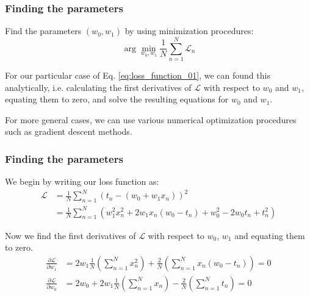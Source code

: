 \documentclass[english,10pt,aspectratio=169,fleqn]{beamer}
\begin{document}
\begin{frame} %
\frametitle{Finding the parameters}

Find the parameters $(w_{0},w_{1})$ by using minimization procedures:
\begin{equation*}
\arg\min_{w_{0},w_{1}} \frac{1}{N} \sum_{n=1}^{N} \mathcal{L}_{n}
\end{equation*}

For our particular case of Eq. \eqref{eq:loss_function_01}, we can found this analytically,
i.e. calculating the first derivatives of $\mathcal{L}$ with respect to $w_0$ and $w_1$, equating
them to zero, and solve the resulting equations for $w_0$ and $w_1$.

For more general cases, we can use various numerical optimization procedures such as
gradient descent methods.

\end{frame} %


\begin{frame} %
\frametitle{Finding the parameters}

We begin by writing our loss function as:
\begin{align*}
\mathcal{L} & = \frac{1}{N} \sum_{n=1}^{N} \left( t_n - (w_0 + w_1 x_{n}) \right)^2 \\
& = \frac{1}{N} \sum_{n=1}^{N} \left( w_1^2 x_n^2 + 2w_{1}x_{n}(w_0 - t_n) + w_0^2 - 2w_0 t_n + t_n^2 \right)
\end{align*}

Now we find the first derivatives of $\mathcal{L}$ with respect to
$w_0$, $w_1$ and equating them to zero.
\begin{align*}
\frac{\partial\mathcal{L}}{\partial w_1} & = 2w_1 \frac{1}{N} \left( \sum_{n=1}^{N} x_n^2 \right) +
\frac{2}{N} \left( \sum_{n=1}^{N} x_{n} (w_0 - t_n) \right) = 0 \\
\frac{\partial \mathcal{L}}{\partial w_0} & = 2w_0 + 2w_1 \frac{1}{N} \left( \sum_{n=1}^{N} x_n \right) -
\frac{2}{N} \left( \sum_{n=1}^{N} t_n \right) = 0
\end{align*}

\end{frame} %
\end{document}
